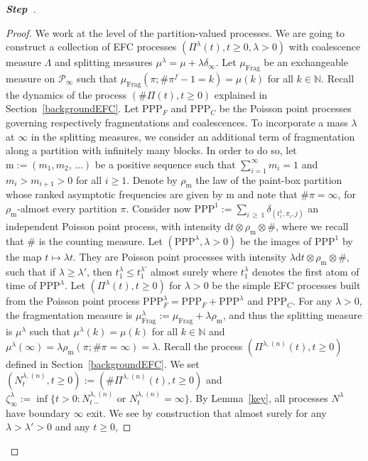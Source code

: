 \documentclass[AHL,Unicode,longabstracts,published]{cedram}
\newcommand{\ddr}{\mathrm{d}}
\newcommand{\rmm}{\mathrm{m}}
\newcommand{\PPP}{\mathrm{PPP}}
\newcommand{\Frag}{\mathrm{Frag}}
\newcommand{\bbN}{\mathbb{N}}
\newcommand{\clP}{\mathcal{P}}
\newcounter{stepcount}
\newenvironment{step}{\refstepcounter{stepcount}\begin{proof}[\textbf{Step~\thestepcount}]}{\end{proof}}
\begin{document}
\begin{step}
\begin{proof}
We work at the level of the partition-valued processes. We are going to construct a collection of EFC processes $(\Pi^{\lambda}(t),t\geq 0,\lambda>0)$ with coalescence measure $\Lambda$ and splitting measures $\mu^{\lambda}=\mu+\lambda \delta_{\infty}$. Let $\mu_{\Frag}$ be an exchangeable measure on $\clP_{\infty}$ such that $\mu_{\Frag}(\pi;\#\pi^{f}-1=k)=\mu(k)$ for all $k\in \bbN$. Recall the dynamics of the process $(\#\Pi(t),t\geq 0)$ explained in Section~\ref{backgroundEFC}. Let $\PPP_F$ and $\PPP_C$ be the Poisson point processes governing respectively fragmentations and coalescences. To incorporate a mass $\lambda$ at $\infty$ in the splitting measures, we consider an additional term of fragmentation along a partition with infinitely many blocks. In order to do so, let $\rmm:=(m_1,m_2,\,\ldots)$ be a positive sequence such that $\sum_{i=1}^{\infty}m_i=1$ and $m_i>m_{i+1}>0$ for all $i\geq 1$. Denote by $\rho_{\rmm}$ the law of the paint-box partition whose ranked asymptotic frequencies are given by $\rmm$ and note that $\#\pi=\infty$, for $\rho_{\rmm}$-almost every partition $\pi$. Consider now $\PPP^{1}:=\sum_{i\,\geq\,1}\delta_{(t^{1}_i,\pi_i,j)}$ an independent Poisson point process, with intensity $\ddr t\otimes \rho_{\rmm}\otimes \#$, where we recall that $\#$ is the counting measure. Let $(\PPP^{\lambda}, \lambda>0)$ be the images of $\PPP^{1}$ by the map $t\mapsto \lambda t$. They are Poisson point processes with intensity $\lambda \ddr t\otimes \rho_{\rmm}\otimes \#$, such that if $\lambda\geq \lambda'$, then $t_1^{\lambda}\leq t_1^{\lambda'}$ almost surely where $t_1^{\lambda}$ denotes the first atom of time of $\PPP^{\lambda}$. Let $(\Pi^{\lambda}(t),t\geq 0)$ for $\lambda>0$ be the simple EFC processes built from the Poisson point process $\PPP^{\lambda}_{F}=\PPP_F+\PPP^{\lambda}$ and $\PPP_C$. For any $\lambda>0$, the fragmentation measure is $\mu^{\lambda}_{\Frag}:=\mu_{\Frag}+\lambda \rho_{\rmm}$, and thus the splitting measure is $\mu^{\lambda}$ such that $\mu^{\lambda}(k)=\mu(k)$ for all $k\in \bbN$ and $\mu^{\lambda}(\infty)=\lambda \rho_{\rmm}(\pi; \#\pi=\infty)=\lambda$. Recall the process $(\Pi^{\lambda,(n)}(t),t\geq 0)$ defined in Section~\ref{backgroundEFC}. We set $(N_t^{\lambda,(n)},t\geq 0):=(\#\Pi^{\lambda,(n)}(t),t\geq 0)$ and $\zeta_{\infty}^{\lambda}:=\inf\{t>0: N_{t-}^{\lambda,(n)}\text{ or } N_{t}^{\lambda,(n)}=\infty\}$. By Lemma~\ref{key}, all processes $N^{\lambda}$ have boundary $\infty$ exit. We see by construction that almost surely for any $\lambda>\lambda'>0$ and any $t\geq 0$,

\end{proof}
\end{step}
\end{document}
